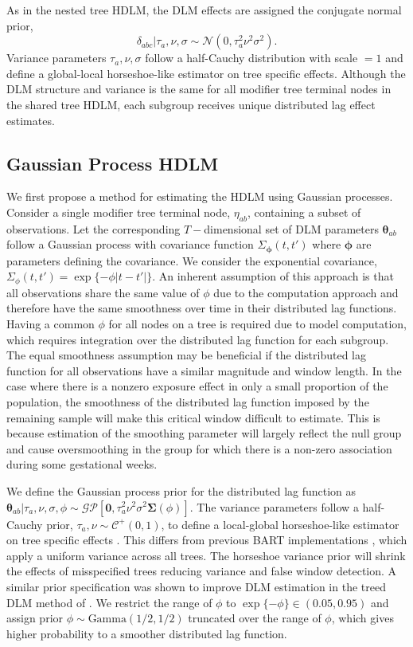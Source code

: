 \documentclass[12pt]{article}
\begin{document}
As in the nested tree HDLM, the DLM effects are assigned the conjugate normal prior,
\begin{equation}
    \delta_{abc}|\tau_a,\nu,\sigma\sim\mathcal{N}(0,\tau_a^2\nu^2\sigma^2).
\end{equation}
Variance parameters $\tau_a,\nu,\sigma$ follow a half-Cauchy distribution with scale $=1$ and define a global-local horseshoe-like estimator on tree specific effects. Although the DLM structure and variance is the same for all modifier tree terminal nodes in the shared tree HDLM, each subgroup receives unique distributed lag effect estimates.

\subsection{Gaussian Process HDLM}
We first propose a method for estimating the HDLM using Gaussian processes. Consider a single modifier tree terminal node, $\eta_{ab}$, containing a subset of observations. Let the corresponding $T-$dimensional set of DLM parameters $\boldsymbol\theta_{ab}$ follow a Gaussian process with covariance function $\Sigma_{\boldsymbol\phi}(t,t')$ where $\boldsymbol\phi$ are parameters defining the covariance. We consider the exponential covariance, $\Sigma_{\phi}(t,t')=\exp\{-\phi|t-t'|\}$. An inherent assumption of this approach is that all observations share the same value of $\phi$ due to the computation approach and therefore have the same smoothness over time in their distributed lag functions. Having a common $\phi$ for all nodes on a tree is required due to model computation, which requires integration over the distributed lag function for each subgroup. The equal smoothness assumption may be beneficial if the distributed lag function for all observations have a similar magnitude and window length. In the case where there is a nonzero exposure effect in only a small proportion of the population, the smoothness of the distributed lag function imposed by the remaining sample will make this critical window difficult to estimate. This is because estimation of the smoothing parameter will largely reflect the null group and cause oversmoothing in the group for which there is a non-zero association during some gestational weeks.

We define the Gaussian process prior for the distributed lag function as $\boldsymbol\theta_{ab} |\tau_a,\nu,\sigma,\phi \sim \mathcal{GP}[\mathbf{0},\tau_a^2\nu^2\sigma^2\boldsymbol\Sigma(\phi)]$.
The variance parameters follow a half-Cauchy prior, $\tau_a,\nu\sim\mathcal{C}^+(0,1)$, to define a local-global horseshoe-like estimator on tree specific effects \citep{Carvalho2010}. This differs from previous BART implementations \citep{Chipman2012,Starling2019}, which apply a uniform variance across all trees. The horseshoe variance prior will shrink the effects of misspecified trees reducing variance and false window detection. A similar prior specification was shown to improve DLM estimation in the treed DLM method of \cite{Mork2022EstimatingPairs}. We restrict the range of $\phi$ to $\exp\{-\phi\}\in(0.05, 0.95)$ and assign prior $\phi\sim\text{Gamma}(1/2,1/2)$ truncated over the range of $\phi$, which gives higher probability to a smoother distributed lag function.
\end{document}
